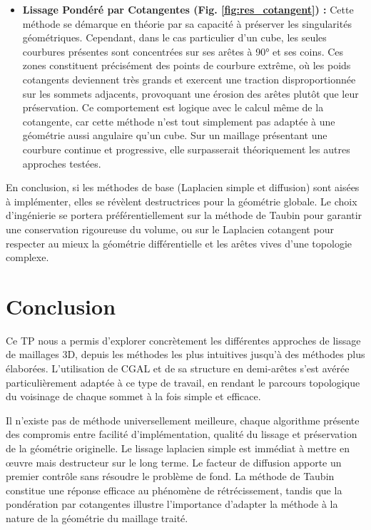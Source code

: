 \documentclass[11pt,a4paper]{article}
\begin{document}
\begin{itemize}
    
    \item \textbf{Lissage Pondéré par Cotangentes (Fig. \ref{fig:res_cotangent}) :} 
    Cette méthode se démarque en théorie par sa capacité à préserver les singularités géométriques. Cependant, dans le cas particulier d'un cube, les seules courbures
    présentes sont concentrées sur ses arêtes à 90° et ses coins. Ces zones constituent précisément des points de courbure extrême, où les poids cotangents deviennent très grands et exercent une traction disproportionnée sur les
    sommets adjacents, provoquant une érosion des arêtes plutôt que leur préservation.
    Ce comportement est logique avec le calcul même de la cotangente, car cette méthode n'est tout simplement pas adaptée à une géométrie aussi angulaire qu'un cube.
    Sur un maillage présentant une courbure continue et progressive, elle surpasserait théoriquement les autres approches testées.
\end{itemize}

En conclusion, si les méthodes de base (Laplacien simple et diffusion) sont aisées à implémenter, elles se révèlent destructrices pour la géométrie globale. Le choix d'ingénierie se portera préférentiellement sur la méthode de Taubin pour garantir une conservation rigoureuse du volume, ou sur le Laplacien cotangent pour respecter au mieux la géométrie différentielle et les arêtes vives d'une topologie complexe.

\section{Conclusion}

Ce TP nous a permis d'explorer concrètement les différentes approches de lissage de maillages 3D, depuis les méthodes les plus intuitives jusqu'à des méthodes plus élaborées.
L'utilisation de CGAL et de sa structure en demi-arêtes s'est avérée particulièrement adaptée à ce type de travail, en rendant le parcours topologique du voisinage de chaque sommet
à la fois simple et efficace.

Il n'existe pas de méthode universellement meilleure, chaque algorithme présente des compromis entre facilité d'implémentation, qualité du lissage
et préservation de la géométrie originelle. Le lissage laplacien simple est immédiat à mettre en œuvre mais destructeur sur le long terme. Le facteur de diffusion apporte un premier contrôle
sans résoudre le problème de fond. La méthode de Taubin constitue une réponse efficace au phénomène de rétrécissement, tandis que la pondération par cotangentes illustre
l'importance d'adapter la méthode à la nature de la géométrie du maillage traité.

    
\end{document}
